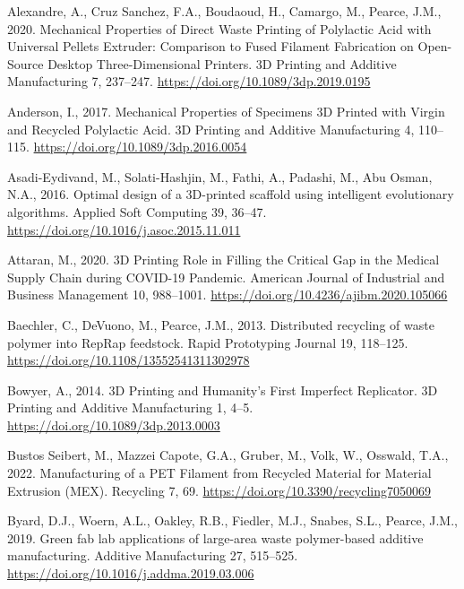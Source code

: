 \documentclass[
  12pt,
  number,
  review]{elsarticle}
\newlength{\cslhangindent}
\newlength{\cslentryspacingunit} %
\newenvironment{CSLReferences}[2] %
 {%
  \setlength{\parindent}{0pt}
  \ifodd #1
  \let\oldpar\par
  \def\par{\hangindent=\cslhangindent\oldpar}
  \fi
  \setlength{\parskip}{#2\cslentryspacingunit}
 }%
 {}
\begin{document}
\hypertarget{refs}{}
\begin{CSLReferences}{1}{0}
\leavevmode{}%
Alexandre, A., Cruz Sanchez, F.A., Boudaoud, H., Camargo, M., Pearce,
J.M., 2020. Mechanical {Properties} of {Direct Waste Printing} of
{Polylactic Acid} with {Universal Pellets Extruder}: {Comparison} to
{Fused Filament Fabrication} on {Open-Source Desktop Three-Dimensional
Printers}. 3D Printing and Additive Manufacturing 7, 237--247.
\url{https://doi.org/10.1089/3dp.2019.0195}

\leavevmode{}%
Anderson, I., 2017. Mechanical {Properties} of {Specimens 3D Printed}
with {Virgin} and {Recycled Polylactic Acid}. 3D Printing and Additive
Manufacturing 4, 110--115. \url{https://doi.org/10.1089/3dp.2016.0054}

\leavevmode{}%
Asadi-Eydivand, M., Solati-Hashjin, M., Fathi, A., Padashi, M., Abu
Osman, N.A., 2016. Optimal design of a {3D-printed} scaffold using
intelligent evolutionary algorithms. Applied Soft Computing 39, 36--47.
\url{https://doi.org/10.1016/j.asoc.2015.11.011}

\leavevmode{}%
Attaran, M., 2020. {3D Printing Role} in {Filling} the {Critical Gap} in
the {Medical Supply Chain} during {COVID-19 Pandemic}. American Journal
of Industrial and Business Management 10, 988--1001.
\url{https://doi.org/10.4236/ajibm.2020.105066}

\leavevmode{}%
Baechler, C., DeVuono, M., Pearce, J.M., 2013. Distributed recycling of
waste polymer into {RepRap} feedstock. Rapid Prototyping Journal 19,
118--125. \url{https://doi.org/10.1108/13552541311302978}

\leavevmode{}%
Bowyer, A., 2014. {3D Printing} and {Humanity}'s {First Imperfect
Replicator}. 3D Printing and Additive Manufacturing 1, 4--5.
\url{https://doi.org/10.1089/3dp.2013.0003}

\leavevmode{}%
Bustos Seibert, M., Mazzei Capote, G.A., Gruber, M., Volk, W., Osswald,
T.A., 2022. Manufacturing of a {PET Filament} from {Recycled Material}
for {Material Extrusion} ({MEX}). Recycling 7, 69.
\url{https://doi.org/10.3390/recycling7050069}

\leavevmode{}%
Byard, D.J., Woern, A.L., Oakley, R.B., Fiedler, M.J., Snabes, S.L.,
Pearce, J.M., 2019. Green fab lab applications of large-area waste
polymer-based additive manufacturing. Additive Manufacturing 27,
515--525. \url{https://doi.org/10.1016/j.addma.2019.03.006}


\end{CSLReferences}
\end{document}
